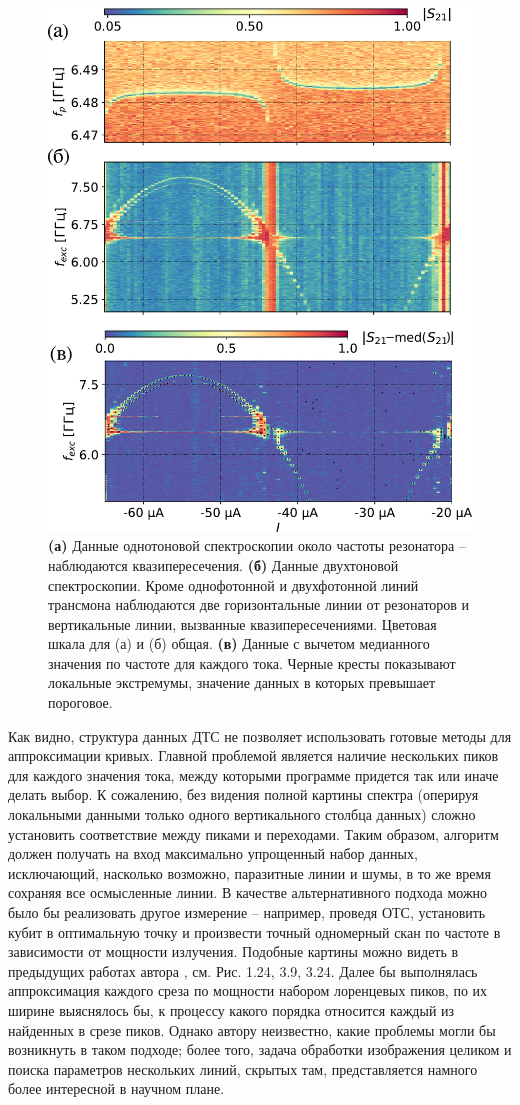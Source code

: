 \documentclass[14pt, a4paper]{extreport}
\numberwithin{equation}{section}
\begin{document}
	
	\begin{figure}[t]
		\centering
		\includegraphics[width=0.6\linewidth]{Pictures/extract_points}
		\caption{\textbf{(а)} Данные однотоновой спектроскопии около частоты резонатора -- наблюдаются квазипересечения. \textbf{(б)} Данные двухтоновой спектроскопии. Кроме однофотонной и двухфотонной линий трансмона наблюдаются две горизонтальные линии от резонаторов и вертикальные линии, вызванные квазипересечениями. Цветовая шкала для (а) и (б) общая. \textbf{(в)} Данные с вычетом медианного значения по частоте для каждого тока. Черные кресты показывают локальные экстремумы, значение данных в которых превышает пороговое.}
		\label{fig:extractpoints}
	\end{figure}
	
	Как видно, структура данных ДТС не позволяет использовать готовые методы для аппроксимации кривых. Главной проблемой является наличие нескольких пиков для каждого значения тока, между которыми программе придется так или иначе делать выбор. К сожалению, без видения полной картины спектра (оперируя локальными данными только одного вертикального столбца данных) сложно установить соответствие между пиками и переходами. Таким образом, алгоритм должен получать на вход максимально упрощенный набор данных, исключающий, насколько возможно,  паразитные линии и шумы, в то же время сохраняя все осмысленные линии. В качестве альтернативного подхода можно было бы реализовать другое измерение -- например, проведя ОТС, установить кубит в оптимальную точку и произвести точный одномерный скан по частоте в зависимости от мощности излучения. Подобные картины можно видеть в предыдущих работах автора \cite{fedorov2017}, см. Рис. 1.24, 3.9, 3.24. Далее бы выполнялась аппроксимация каждого среза по мощности набором лоренцевых пиков, по их ширине выяснялось бы, к процессу какого порядка относится каждый из найденных в срезе пиков. Однако автору неизвестно, какие проблемы могли бы возникнуть в таком подходе; более того, задача обработки изображения целиком и поиска параметров нескольких линий, скрытых там, представляется намного более интересной в научном плане.
	
\end{document}
